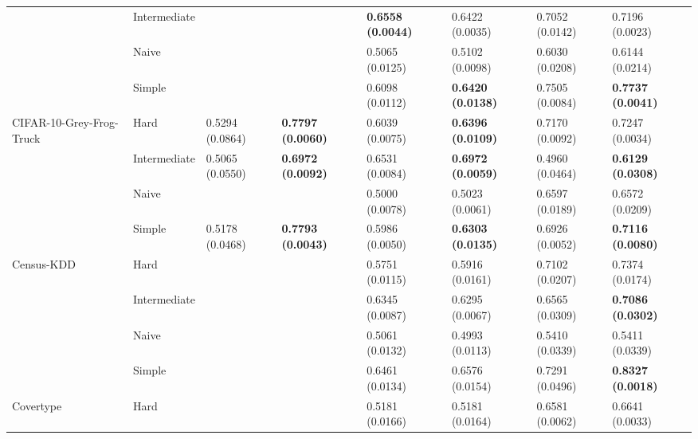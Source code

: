 \begin{tabular}{llllllll}
                 & Intermediate &                  &                           &  \textbf{0.6558 (0.0044)} &           0.6422 (0.0035) &           0.7052 (0.0142) &           0.7196 (0.0023) \\
                 & Naive &                  &                           &           0.5065 (0.0125) &           0.5102 (0.0098) &           0.6030 (0.0208) &           0.6144 (0.0214) \\
                 & Simple &                  &                           &           0.6098 (0.0112) &  \textbf{0.6420 (0.0138)} &           0.7505 (0.0084) &  \textbf{0.7737 (0.0041)} \\
CIFAR-10-Grey-Frog-Truck & Hard &  0.5294 (0.0864) &  \textbf{0.7797 (0.0060)} &           0.6039 (0.0075) &  \textbf{0.6396 (0.0109)} &           0.7170 (0.0092) &           0.7247 (0.0034) \\
                 & Intermediate &  0.5065 (0.0550) &  \textbf{0.6972 (0.0092)} &           0.6531 (0.0084) &  \textbf{0.6972 (0.0059)} &           0.4960 (0.0464) &  \textbf{0.6129 (0.0308)} \\
                 & Naive &                  &                           &           0.5000 (0.0078) &           0.5023 (0.0061) &           0.6597 (0.0189) &           0.6572 (0.0209) \\
                 & Simple &  0.5178 (0.0468) &  \textbf{0.7793 (0.0043)} &           0.5986 (0.0050) &  \textbf{0.6303 (0.0135)} &           0.6926 (0.0052) &  \textbf{0.7116 (0.0080)} \\
Census-KDD & Hard &                  &                           &           0.5751 (0.0115) &           0.5916 (0.0161) &           0.7102 (0.0207) &           0.7374 (0.0174) \\
                 & Intermediate &                  &                           &           0.6345 (0.0087) &           0.6295 (0.0067) &           0.6565 (0.0309) &  \textbf{0.7086 (0.0302)} \\
                 & Naive &                  &                           &           0.5061 (0.0132) &           0.4993 (0.0113) &           0.5410 (0.0339) &           0.5411 (0.0339) \\
                 & Simple &                  &                           &           0.6461 (0.0134) &           0.6576 (0.0154) &           0.7291 (0.0496) &  \textbf{0.8327 (0.0018)} \\
Covertype & Hard &                  &                           &           0.5181 (0.0166) &           0.5181 (0.0164) &           0.6581 (0.0062) &           0.6641 (0.0033) \\

\end{tabular}
